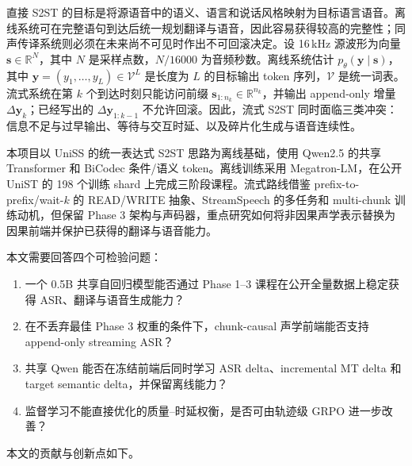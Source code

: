 \documentclass[11pt,a4paper]{article}
\newcommand{\vect}[1]{\bm{#1}}
\newcommand{\R}{\mathbb{R}}
\newcommand{\Vocab}{\mathcal{V}}
\begin{document}
直接 S2ST 的目标是将源语音中的语义、语言和说话风格映射为目标语言语音。离线系统可在完整语句到达后统一规划翻译与语音，因此容易获得较高的完整性；同声传译系统则必须在未来尚不可见时作出不可回滚决定。设 16\,kHz 源波形为向量 $\vect{s}\in\R^{N}$，其中 $N$ 是采样点数，$N/16000$ 为音频秒数。离线系统估计 $p_\theta(\vect{y}\mid\vect{s})$，其中 $\vect{y}=(y_1,\ldots,y_L)\in\Vocab^L$ 是长度为 $L$ 的目标输出 token 序列，$\Vocab$ 是统一词表。流式系统在第 $k$ 个到达时刻只能访问前缀 $\vect{s}_{1:n_k}\in\R^{n_k}$，并输出 append-only 增量 $\Delta\vect{y}_k$；已经写出的 $\Delta\vect{y}_{1:k-1}$ 不允许回滚。因此，流式 S2ST 同时面临三类冲突：信息不足与过早输出、等待与交互时延、以及碎片化生成与语音连续性。

本项目以 UniSS 的统一表达式 S2ST 思路为离线基础\cite{cheng2025uniss}，使用 Qwen2.5\cite{yang2024qwen25} 的共享 Transformer 和 BiCodec 条件/语义 token。离线训练采用 Megatron-LM\cite{shoeybi2019megatron}，在公开 UniST 的 198 个训练 shard 上完成三阶段课程。流式路线借鉴 prefix-to-prefix/wait-$k$ 的 READ/WRITE 抽象\cite{ma2019stacl}、StreamSpeech 的多任务和 multi-chunk 训练动机\cite{zhang2024streamspeech}，但保留 Phase 3 架构与声码器，重点研究如何将非因果声学表示替换为因果前端并保护已获得的翻译与语音能力。

本文需要回答四个可检验问题：

\begin{enumerate}
  \item 一个 0.5B 共享自回归模型能否通过 Phase 1--3 课程在公开全量数据上稳定获得 ASR、翻译与语音生成能力？
  \item 在不丢弃最佳 Phase 3 权重的条件下，chunk-causal 声学前端能否支持 append-only streaming ASR？
  \item 共享 Qwen 能否在冻结前端后同时学习 ASR delta、incremental MT delta 和 target semantic delta，并保留离线能力？
  \item 监督学习不能直接优化的质量--时延权衡，是否可由轨迹级 GRPO 进一步改善？
\end{enumerate}

本文的贡献与创新点如下。
\end{document}

